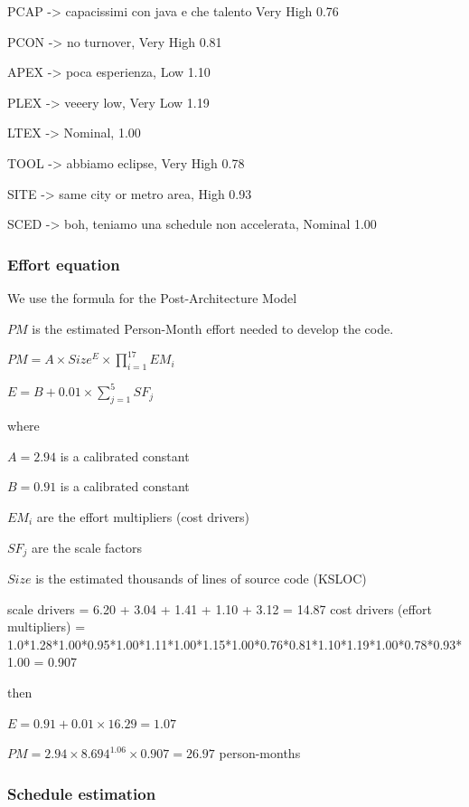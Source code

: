 \documentclass[english]{article}
\begin{document}
PCAP -> capacissimi con java e che talento Very High 0.76

PCON -> no turnover, Very High 0.81

APEX -> poca esperienza, Low 1.10

PLEX -> veeery low, Very Low 1.19

LTEX -> Nominal, 1.00

TOOL -> abbiamo eclipse, Very High 0.78

SITE -> same city or metro area, High 0.93

SCED -> boh, teniamo una schedule non accelerata, Nominal 1.00

\subsubsection{Effort equation}

We use the formula for the Post-Architecture Model

$PM$ is the estimated Person-Month effort needed to develop the code.


\begin{center}
$ PM = A \times Size^E \times \prod_{i=1}^{17} EM_i $
\end{center}

\begin{center}
$ E = B + 0.01 \times \sum_{j=1}^{5} SF_j $
\end{center}

where

$ A = 2.94 $ is a calibrated constant 

$ B = 0.91 $ is a calibrated constant

$EM_i$ are the effort multipliers (cost drivers)

$SF_j$ are the scale factors

$Size$ is the estimated thousands of lines of source code (KSLOC)


scale drivers = 6.20 + 3.04 + 1.41 + 1.10 + 3.12 = 14.87
cost drivers (effort multipliers) = 1.0*1.28*1.00*0.95*1.00*1.11*1.00*1.15*1.00*0.76*0.81*1.10*1.19*1.00*0.78*0.93*1.00 = 0.907

then

$E = 0.91 + 0.01 \times 16.29 = 1.07$

$PM = 2.94 \times 8.694^{1.06} \times 0.907 = 26.97$ person-months

\subsubsection{Schedule estimation}
\end{document}
